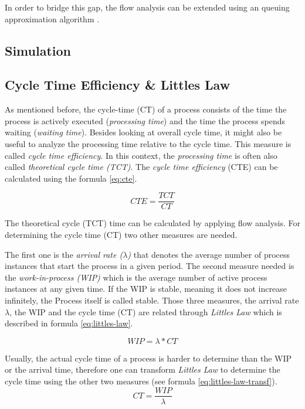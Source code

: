 In order to bridge this gap, the flow analysis can be extended using an queuing approximation algorithm \cite{ha2006approximate}.


\subsection{Simulation}

\subsection{Cycle Time Efficiency \& Littles Law}
As mentioned before, the \gls{cycle-time} (CT) of a process consists of the time the process is actively executed (\textit{processing time}) and the time the process spends waiting (\textit{waiting time}). Besides looking at overall cycle time, it might also be useful to analyze the processing time relative to the cycle time. This measure is called \textit{cycle time efficiency}. In this context, the \textit{processing time} is often also called \textit{theoretical cycle time (TCT)}. The \textit{cycle time efficiency} (CTE) can be calculated using the formula \ref{eq:cte}.\cite{fundamentals}

\begin{equation}\label{eq:cte}
	CTE = \dfrac{TCT}{CT}
\end{equation}

The theoretical cycle (TCT) time can be calculated by applying flow analysis. For determining the cycle time (CT) two other measures are needed. 

The first one is the \textit{arrival rate ($\lambda$)} that denotes the average number of process instances that start the process in a given period. The second measure needed is the \textit{work-in-process (WIP)} which is the average number of active process instances at any given time. If the WIP is stable, meaning it does not increase infinitely, the Process itself is called stable. Those three measures, the arrival rate $\lambda$, the WIP and the cycle time (CT) are related through \textit{Littles Law} which is described in formula \ref{eq:littles-law}.\cite{little2008little}

\begin{equation}\label{eq:littles-law}
	WIP = \lambda * CT
\end{equation}

Usually, the actual cycle time of a process is harder to determine than the WIP or the arrival time, therefore one can transform \textit{Littles Law} to determine the cycle time using the other two measures (see formula \ref{eq:littles-law-transf}).
\begin{equation}\label{eq:littles-law-transf}
	CT = \dfrac{WIP}{\lambda}
\end{equation}
